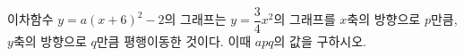 이차함수 $y=a(x+6)^2-2$의 그래프는 $y=\dfrac{3}{4}x^2$의 그래프를 $x$축의 방향으로 $p$만큼, $y$축의 방향으로 $q$만큼 평행이동한 것이다. 이때 $apq$의 값을 구하시오. 
